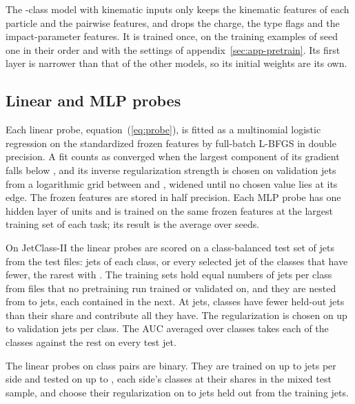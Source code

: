 The \Kfull-class model with kinematic inputs only keeps the \FillTopNPresent{} kinematic features of
each particle and the pairwise features, and drops the charge, the type flags and the impact-parameter
features. It is trained once, on the training examples of seed one in their order and with the settings of
appendix~\ref{sec:app-pretrain}. Its first layer is narrower than that of the other models, so its
initial weights are its own.

\subsection{Linear and MLP probes}\label{sec:app-probes}

Each linear probe, equation~(\ref{eq:probe}), is fitted as a multinomial logistic regression on the
standardized frozen features by full-batch L-BFGS in double precision. A fit counts as converged when the largest component of its
gradient falls below \LpConvergedGrad, and its inverse regularization strength is chosen on validation
jets from a logarithmic grid between \LpCMin{} and \LpVfourCMax, widened until no chosen value lies at its edge.
The frozen features are stored in half precision.
Each MLP probe has one hidden layer of \LpMlpHidden{} units and is trained on the same frozen features at
the largest training set of each task; its result is the average over \LpMlpSeedsWord{} seeds.

On JetClass-II the linear probes are scored on a class-balanced test set of \JcBalNTest{} jets from the
test files: \JcBalTestPerClass{} jets of each class, or every selected jet of the \JcBalNShort{} classes
that have fewer, the rarest with \JcBalRarestTest. The training sets hold equal numbers of jets per class
from files that no pretraining run trained or validated on, and they are nested from \FtSizeEThree{} to
\FtSizeESix{} jets, each contained in the next. At \FtSizeESix{} jets, \JcBalShortTrainESix{} classes
have fewer held-out jets than their share and contribute all they have. The regularization is chosen on
up to \JcBalValPerClass{} validation jets per class. The AUC averaged over classes takes each of the
\Kfull{} classes against the rest on every test jet.

The linear probes on class pairs are binary. They are trained on up to \JcBalPairTrainPerSide{} jets
per side and tested on up to \JcBalPairTestPerSide, each side's classes at their shares in the mixed test sample, and choose
their regularization on \LpPairNValMin{} to \LpPairNValMax{} jets held out from the training jets.

